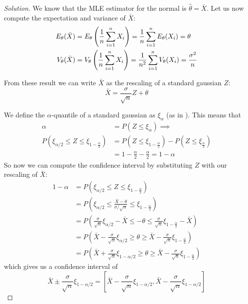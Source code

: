 \documentclass[12pt]{extarticle}
\begin{document}
\begin{proof}[Solution]
    We know that the MLE estimator for the normal is $\hat \theta = \bar X$.
    Let us now compute the expectation and variance of $\bar X$:
    \begin{align}
        E_{\theta} (\bar X) & = E_\theta \left( \frac{1}{n} \sum_{i = 1}^n X_i \right) = \frac{1}{n} \sum_{i = 1}^n E_\theta(X_i) = \theta                \\
        V_{\theta} (\bar X) & = V_\theta \left( \frac{1}{n} \sum_{i = 1}^n X_i \right) = \frac{1}{n^2} \sum_{i = 1}^n V_\theta(X_i) = \frac{\sigma^2}{n}
    \end{align}

    From these result we can write $\bar X$ as the rescaling of a standard gaussian $Z$:
    \begin{equation}
        \bar X = \frac{\sigma}{\sqrt{n}} Z + \theta
    \end{equation}

    We define the $\alpha$-quantile of a standard gaussian as $\xi_\alpha$ (as in ).
    This means that
    \begin{align}
        \alpha                                                 & = P(Z \leq \xi_\alpha) \implies                                        \\
        P(\xi_{\alpha/2} \leq Z \leq \xi_{1-\frac{\alpha}{2}}) & = P(Z \leq \xi_{1-\frac{\alpha}{2}}) -P(Z \leq \xi_{\frac{\alpha}{2}}) \\
                                                               & = 1-\frac{\alpha}{2} -\frac{\alpha}{2} = 1- \alpha
    \end{align}
    So now we can compute the confidence interval by substituting $Z$ with our rescaling of $\bar X$:
    \begin{align}
        1 - \alpha & = P(\xi_{\alpha/2} \leq Z \leq \xi_{1-\frac{\alpha}{2}})                                                                                 \\
                   & = P\left(\xi_{\alpha/2} \leq \frac{\bar X - \theta}{\sigma / \sqrt n} \leq \xi_{1-\frac{\alpha}{2}}\right)                               \\
                   & = P\left(\frac{\sigma}{\sqrt n}\xi_{\alpha/2} - \bar X \leq - \theta \leq \frac{\sigma}{\sqrt n}\xi_{1-\frac{\alpha}{2}} - \bar X\right) \\
                   & = P\left(\bar X - \frac{\sigma}{\sqrt n}\xi_{\alpha/2} \geq \theta \geq \bar X -\frac{\sigma}{\sqrt n}\xi_{1-\frac{\alpha}{2}}\right)    \\
                   & = P\left(\bar X + \frac{\sigma}{\sqrt n}\xi_{1-\alpha/2} \geq \theta \geq \bar X -\frac{\sigma}{\sqrt n}\xi_{1-\frac{\alpha}{2}}\right)
    \end{align}
    which gives us a confidence interval of
    \begin{equation}
        \bar X \pm \frac{\sigma}{\sqrt n}\xi_{1-\alpha/2} = [\bar X - \frac{\sigma}{\sqrt n}\xi_{1-\alpha/2}, \bar X - \frac{\sigma}{\sqrt n}\xi_{1-\alpha/2}]
    \end{equation}
\end{proof}
\end{document}

